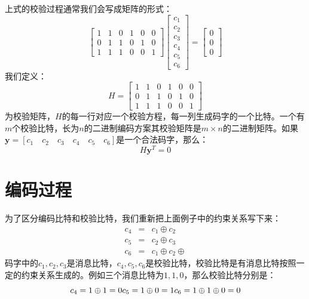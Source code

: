 \documentclass[10pt,a4paper,UTF8]{article}
\begin{document}
上式的校验过程通常我们会写成矩阵的形式：
\begin{equation}
\label{eq:4}
\begin{bmatrix}
1 & 1 & 0  & 1 & 0 & 0 \\
0 & 1 & 1  & 0 & 1 & 0 \\
1 & 1 & 1  & 0 & 0 & 1
\end{bmatrix}
\begin{bmatrix}
c_{1} \\ c_{2} \\ c_{3} \\ c_{4} \\ c_{5} \\ c_{6}
\end{bmatrix}
=
\begin{bmatrix}
0 \\ 0 \\ 0
\end{bmatrix}
\end{equation}
我们定义：
\begin{equation}
\label{eq:5}
H =
\begin{bmatrix}
1 & 1 & 0  & 1 & 0 & 0 \\
0 & 1 & 1  & 0 & 1 & 0 \\
1 & 1 & 1  & 0 & 0 & 1
\end{bmatrix}
\end{equation}
为校验矩阵，\(H\)的每一行对应一个校验方程，每一列生成码字的一个比特。一个有\(m\)个校验比特，长为\(n\)的二进制编码方案其校验矩阵是\(m\times n\)的二进制矩阵。如果\(\mathbf{y} = [c_{1} \quad c_{2}\quad c_{3} \quad c_{4} \quad c_{5} \quad c_{6}]\)是一个合法码字，那么：
\begin{equation}
\label{eq:6}
H\mathbf{y}^{T} = 0
\end{equation}
\section{编码过程}
\label{sec:org611473a}


为了区分编码比特和校验比特，我们重新把上面例子中的约束关系写下来：
\begin{eqnarray*}
c_{4}&=&  c_{1}\oplus c_{2} \\
c_{5}&=& c_{2} \oplus c_{3} \\
c_{6}&=& c_{1}\oplus c_{2} \oplus
\end{eqnarray*}
码字中的\(c_{1},c_{2},c_{3}\)是消息比特，\(c_{4},c_{5},c_{6}\)是校验比特，校验比特是有消息比特按照一定的约束关系生成的。例如三个消息比特为\(1,1,0\)，那么校验比特分别是：
\begin{equation}
\label{eq:7}
c_{4} = 1\oplus 1 = 0 \\
c_{5} = 1\oplus 0 = 1 \\
c_{6} = 1\oplus 1\oplus 0 = 0
\end{equation}
\end{document}
